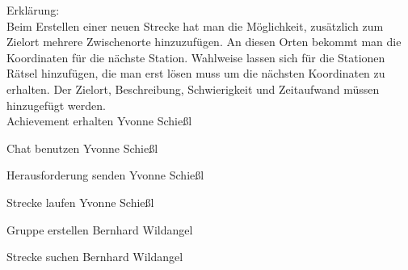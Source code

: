 \documentclass[a4paper, 12pt]{article}
\begin{document}
Erklärung:\\
Beim Erstellen einer neuen Strecke hat man die Möglichkeit, zusätzlich zum Zielort mehrere Zwischenorte hinzuzufügen. An diesen Orten bekommt man die Koordinaten für die nächste Station. Wahlweise lassen sich für die Stationen Rätsel hinzufügen, die man erst lösen muss um die nächsten Koordinaten zu erhalten. Der Zielort, Beschreibung, Schwierigkeit und Zeitaufwand müssen hinzugefügt werden.\\

{\Large Achievement erhalten}
Yvonne Schießl
\begin{figure}[H] 
\centering
\end{figure}
\newpage

{\Large Chat benutzen}
Yvonne Schießl
\begin{figure}[H] 
\centering
\end{figure}

{\Large Herausforderung senden}
Yvonne Schießl
\begin{figure}[H] 
\centering
\end{figure}
\newpage

{\Large Strecke laufen}
Yvonne Schießl
\begin{figure}[H] 
\centering
\end{figure}
\newpage

{\Large Gruppe erstellen}
Bernhard Wildangel
\begin{figure}[H] 
\centering
\end{figure}
\newpage
{\Large Strecke suchen}
Bernhard Wildangel
\begin{figure}[H] 
\centering
\end{figure}
\newpage
\end{document}
